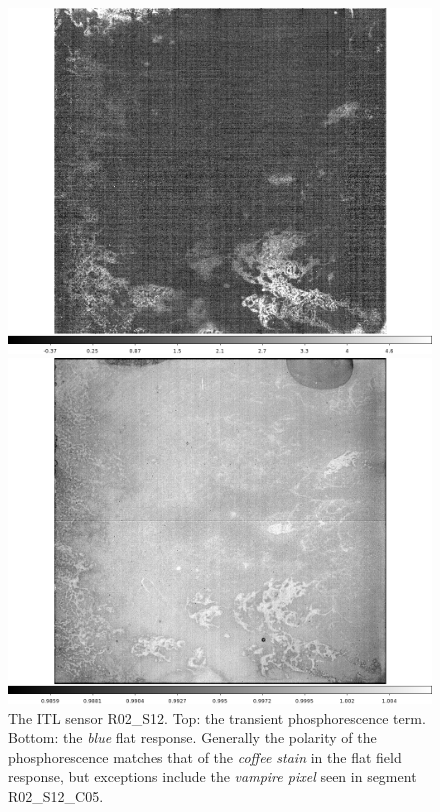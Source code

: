 \begin{figure}[!htbp]
\centering
\begin{minipage}{1.0\textwidth}    
  \centering
  \includegraphics[width=.6\linewidth]{sections/figures/phosphorescence-survey/stains_phos_R02_S12.png}    
\end{minipage}
\begin{minipage}{1.0\textwidth}
  \centering
  \includegraphics[width=.6\linewidth]{sections/figures/phosphorescence-survey/stains_abs_R02_S12.png}
\end{minipage}
\caption{The ITL sensor R02\_S12. Top: the transient phosphorescence term. Bottom: the {\it blue} flat response. Generally the polarity of the phosphorescence matches that of the {\it coffee stain} in the flat field response, but exceptions include the {\it vampire pixel} seen in segment R02\_S12\_C05.}
\label{fig:phos:stains:R02S12}
\end{figure}


